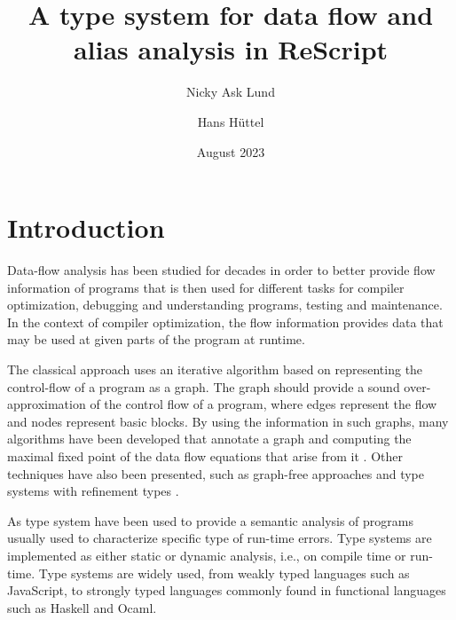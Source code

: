 \documentclass[acmsmall,sigplan]{acmart}
\begin{document}
\title[A type system for data flow analysis]{A type system for data
  flow and alias analysis in ReScript}

\author{Nicky Ask Lund} 

\author{Hans Hüttel} 

\date{August 2023}




\maketitle
\renewcommand{\shortauthors}{}

\section{Introduction}

Data-flow analysis has been studied for decades in order to better
provide flow information of programs that is then used for different
tasks for compiler optimization, debugging and understanding programs,
testing and maintenance.  In the context of compiler optimization, the
flow information provides data that may be used at given parts of the
program at runtime.

The classical approach uses an iterative algorithm based on
representing the control-flow of a program as a graph.  The graph
should provide a sound over-approximation of the control flow of a
program, where edges represent the flow and nodes represent basic
blocks.  By using the information in such graphs, many algorithms have
been developed that annotate a graph and computing the maximal fixed
point of the data flow equations that arise from it
\cite{KildallGaryA1973Auat, RyderBarbara1988Idaa}.  Other techniques
have also been presented, such as graph-free approaches
\cite{HorspoolR.Niegel2002AGAt} and type systems with refinement types
\cite{PavlinovicZvonimir2021Dfrt}.

As type system have been used to provide a semantic analysis of
programs usually used to characterize specific type of run-time
errors. Type systems are implemented as either static or dynamic
analysis, i.e., on compile time or run-time.  Type systems are widely
used, from weakly typed languages such as JavaScript, to strongly
typed languages commonly found in functional languages such as Haskell
and Ocaml.
\end{document}
